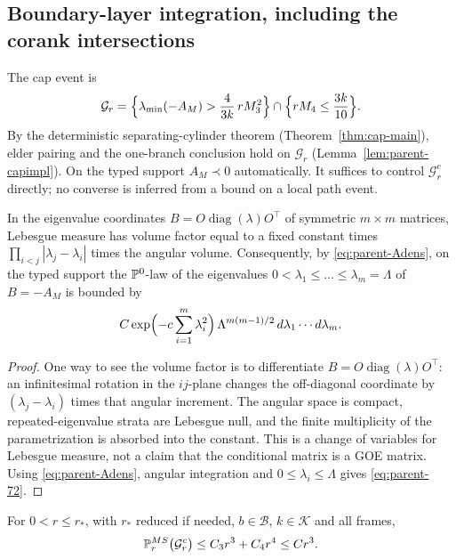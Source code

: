 \subsection{Boundary-layer integration, including the corank intersections}\label{ssec:parent-layer}

The cap event is
\begin{equation}\label{eq:parent-G}
\mathcal G_r=\Bigl\{\lambda_{\min}(-A_M)>\frac4{3k}\,rM_3^2\Bigr\}\cap\Bigl\{rM_4\le\frac{3k}{10}\Bigr\}.
\end{equation}
By the deterministic separating-cylinder theorem (Theorem~\ref{thm:cap-main}), elder pairing and the one-branch conclusion hold on $\mathcal G_r$ (Lemma~\ref{lem:parent-capimpl}). On the typed support $A_M\prec0$ automatically. It suffices to control $\mathcal G_r^c$ directly; no converse is inferred from a bound on a local path event.

\begin{lemma}\label{lem:parent-eigen}
In the eigenvalue coordinates $B=O\operatorname{diag}(\lambda)O^{\top}$ of symmetric $m\times m$ matrices, Lebesgue measure has volume factor equal to a fixed constant times $\prod_{i<j}|\lambda_j-\lambda_i|$ times the angular volume. Consequently, by \eqref{eq:parent-Adens}, on the typed support the $\mathbb P^0$-law of the eigenvalues $0<\lambda_1\le\dots\le\lambda_m=\Lambda$ of $B=-A_M$ is bounded by
\begin{equation}\label{eq:parent-72}
C\exp\Bigl(-c\sum_{i=1}^m\lambda_i^2\Bigr)\,\Lambda^{m(m-1)/2}\,d\lambda_1\cdots d\lambda_m .
\end{equation}
\end{lemma}

\begin{proof}
One way to see the volume factor is to differentiate $B=O\operatorname{diag}(\lambda)O^{\top}$: an infinitesimal rotation in the $ij$-plane changes the off-diagonal coordinate by $(\lambda_j-\lambda_i)$ times that angular increment. The angular space is compact, repeated-eigenvalue strata are Lebesgue null, and the finite multiplicity of the parametrization is absorbed into the constant. This is a change of variables for Lebesgue measure, not a claim that the conditional matrix is a GOE matrix. Using \eqref{eq:parent-Adens}, angular integration and $0\le\lambda_i\le\Lambda$ gives \eqref{eq:parent-72}.
\end{proof}

\begin{proposition}\label{prop:parent-layer}
For $0<r\le r_*$, with $r_*$ reduced if needed, $b\in\mathcal B$, $k\in\mathcal K$ and all frames,
\begin{equation}\label{eq:parent-78}
\mathbb P^{MS}_r\bigl(\mathcal G_r^c\bigr)\le C_3r^3+C_4r^4\le Cr^3 .
\end{equation}
\end{proposition}

